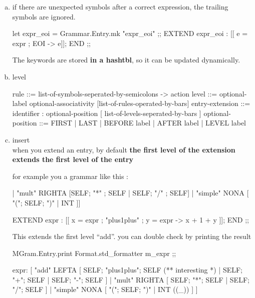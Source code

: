 \begin{enumerate}[(a)]
\begin{enumerate}[(a)]
\item if there are unexpected symbols after a correct expression, the trailing symbols are ignored.

\begin{bluecode}
let expr_eoi = Grammar.Entry.mk "expr_eoi" ;;
EXTEND expr_eoi : [[ e = expr ; EOI -> e]]; END ;;
\end{bluecode}

The keywords are stored {\bf in a hashtbl}, so it can be updated
dynamically.

\item level \\
  \begin{bluetext}
  rule ::= list-of-symbols-seperated-by-semicolons -> action 
  level ::=  optional-label optional-associativity
  [list-of-rules-operated-by-bars] 
  entry-extension ::=
  identifier : optional-position  [ list-of-levels-seperated-by-bars ] 
  optional-position ::= FIRST | LAST | BEFORE label | AFTER label |
  LEVEL label  
  \end{bluetext}
\item insert  \\
  when you extend an entry, by default \textbf{ the first level of the
    extension extends the first level of the entry}

for example you a grammar like this : 

\begin{bluecode}
    ["add" LEFTA
    [SELF; "+" ; SELF | SELF; "-" ; SELF]
    | "mult" RIGHTA
    [SELF; "*" ; SELF | SELF; "/" ; SELF]
    | "simple" NONA
    [ "("; SELF; ")"  | INT ]]   
\end{bluecode}

  \begin{bluecode}
EXTEND expr : [[ x = expr ; "plus1plus" ; y = expr -> x + 1 + y ]];
END ;;    
\end{bluecode}
This extends the first level  ``add''. you can double check by printing
the result 

\begin{redcode}
MGram.Entry.print Format.std_formatter m_expr ;;
\end{redcode}

\begin{bluecode}  
expr: [ "add" LEFTA
  [ SELF; "plus1plus"; SELF (** interesting *)
  | SELF; "+"; SELF
  | SELF; "-"; SELF ]
| "mult" RIGHTA
  [ SELF; "*"; SELF
  | SELF; "/"; SELF ]
| "simple" NONA
  [ "("; SELF; ")"
  | INT ((_)) ] ]  
\end{bluecode}


\end{enumerate}
\end{enumerate}
